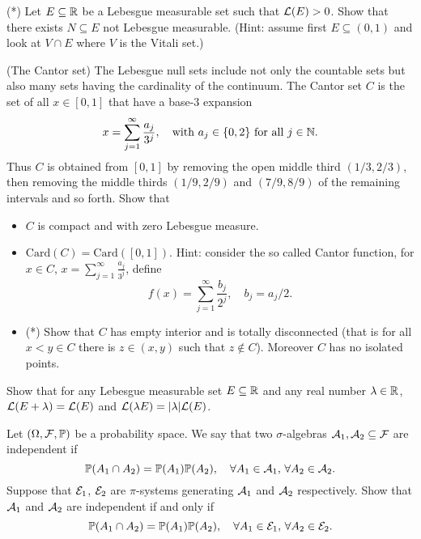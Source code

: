 \begin{problem}(*) Let $E\subseteq \mathbb R$ be a Lebesgue measurable set such that $\mathcal L(E)>0$. Show that there exists $N\subseteq E$ not Lebesgue measurable. (Hint: assume first $E\subseteq (0,1)$ and look at $V\cap E$ where $V$ is the Vitali set.) 
    \end{problem}
    
\begin{problem}(The Cantor set) The Lebesgue null sets include not only the countable sets but also many sets having the cardinality of the continuum. The Cantor set $C$ is the set of all $x \in [0, 1]$ that have a base-$3$ expansion
        \begin{equation*}
            x = \sum_{j=1}^\infty \frac{a_j}{3^j},\quad \text{with $a_j\in\{0,2\}$ for all $j\in \mathbb N$.}
        \end{equation*} 
        Thus $C$ is obtained from $[0,1]$ by removing the open middle third $(1/3,2/3)$, then removing the middle thirds $(1/9,2/9)$ and $(7/9,8/9)$ of the remaining intervals and so forth.
        Show that 
        \begin{itemize}
            \item $C$ is compact and with zero Lebesgue measure.
            \item $\mathrm{Card}(C) = \mathrm{Card}([0,1])$. Hint: consider the so called Cantor function, for $x\in C$, $x=\sum_{j=1}^\infty \frac{a_j}{3^j}$, define
            \begin{equation*}
                f(x) =\sum_{j=1}^\infty \frac{b_j}{2^j},\quad b_j=a_j/2.
            \end{equation*}
            \item (*) Show that $C$ has empty interior and is totally disconnected (that is for all $x<y\in C$ there is $z\in(x,y)$ such that $z\notin C$). Moreover $C$ has no isolated points.
\end{itemize}
\end{problem}
        

\begin{problem}
    Show that for any Lebesgue measurable set $E\subseteq \mathbb R$ and any real number $\lambda\in \mathbb R$, $\mathcal L(E+\lambda) = \mathcal L(E)$ and $\mathcal L(\lambda E) = |\lambda| \mathcal L(E)$.
\end{problem}

\begin{problem}
    Let $(\Omega,\mathcal F,\mathbb P)$ be a probability space. We say that two $\sigma$-algebras $\mathcal A_1, \mathcal A_2\subseteq \mathcal F$ are independent if
    \begin{equation*}
        \mathbb P(A_1\cap A_2) = \mathbb P(A_1)\mathbb P(A_2),\quad \forall A_1\in\mathcal A_1,\,\forall A_2\in \mathcal A_2.
    \end{equation*}
    Suppose that $\mathcal E_1$, $\mathcal E_2$ are $\pi$-systems generating $\mathcal A_1$ and $\mathcal A_2$ respectively. Show that $\mathcal A_1$ and $\mathcal A_2$ are independent if and only if
    \begin{equation*}
        \mathbb P(A_1\cap A_2) = \mathbb P(A_1)\mathbb P(A_2),\quad \forall A_1\in\mathcal E_1,\,\forall A_2\in \mathcal E_2.
    \end{equation*} 
\end{problem}